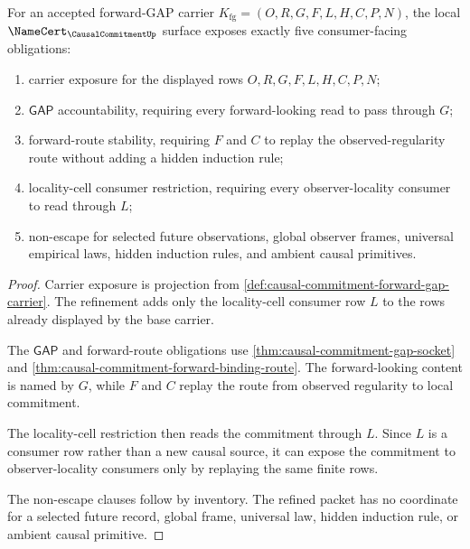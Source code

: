 \begin{theorem}
\label{thm:causal-commitment-forward-gap-obligations}
For an accepted forward-GAP carrier $K_{\mathrm{fg}}=(O,R,G,F,L,H,C,P,N)$, the local $\NameCert_{\CausalCommitmentUp}$ surface exposes exactly five consumer-facing obligations:
\begin{enumerate}
\item carrier exposure for the displayed rows $O,R,G,F,L,H,C,P,N$;
\item $\mathsf{GAP}$ accountability, requiring every forward-looking read to pass through $G$;
\item forward-route stability, requiring $F$ and $C$ to replay the observed-regularity route without adding a hidden induction rule;
\item locality-cell consumer restriction, requiring every observer-locality consumer to read through $L$;
\item non-escape for selected future observations, global observer frames, universal empirical laws, hidden induction rules, and ambient causal primitives.
\end{enumerate}
\end{theorem}
\begin{proof}
Carrier exposure is projection from \autoref{def:causal-commitment-forward-gap-carrier}. The refinement adds only the locality-cell consumer row $L$ to the rows already displayed by the base carrier.

The $\mathsf{GAP}$ and forward-route obligations use \autoref{thm:causal-commitment-gap-socket} and \autoref{thm:causal-commitment-forward-binding-route}. The forward-looking content is named by $G$, while $F$ and $C$ replay the route from observed regularity to local commitment.

The locality-cell restriction then reads the commitment through $L$. Since $L$ is a consumer row rather than a new causal source, it can expose the commitment to observer-locality consumers only by replaying the same finite rows.

The non-escape clauses follow by inventory. The refined packet has no coordinate for a selected future record, global frame, universal law, hidden induction rule, or ambient causal primitive.
\end{proof}

